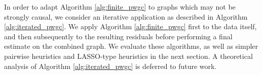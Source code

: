 \documentclass[12pt]{article}
\begin{document}
\begin{algorithm}
\end{algorithm}

In order to adapt Algorithm \ref{alg:finite_pwgc} to graphs which may
not be strongly causal, we consider an iterative application as
described in Algorithm \ref{alg:iterated_pwgc}.  We apply Algorithm
\ref{alg:finite_pwgc} first to the data itself, and then subsequently
to the resulting residuals before performing a final estimate on the
combined graph.  We evaluate these algorithms, as well as simpler
pairwise heuristics and LASSO-type heuristics in the next section.  A
theoretical analysis of Algorithm \ref{alg:iterated_pwgc} is deferred
to future work.
\end{document}
